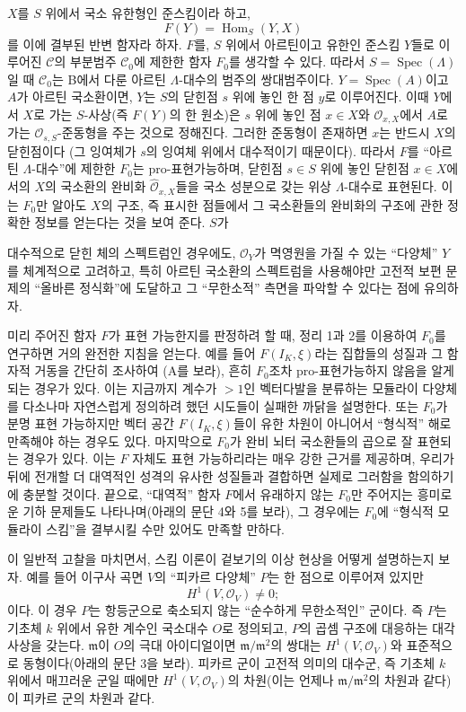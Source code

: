 \documentclass[11pt,twoside,openany]{book}
\numberwithin{equation}{section}
\newcommand{\sourceunit}{front}
\newcommand{\src}[1]{%
  \phantomsection\hypertarget{src:\sourceunit:#1}{}%
  \marginpar{\raggedleft\footnotesize\sffamily #1}%
}
\theoremstyle{plain}
\theoremstyle{definition}
\theoremstyle{remark}
\begin{document}
$X$를 $S$ 위에서 국소 유한형인 준스킴이라 하고,
\[
  F(Y)=\operatorname{Hom}_S(Y,X)
\]
를 이에 결부된 반변 함자라 하자. $F$를, $S$ 위에서 아르틴이고 유한인
준스킴 $Y$들로 이루어진 $\mathcal C$의 부분범주 $\mathcal C_0$에
제한한 함자 $F_0$를 생각할 수 있다. 따라서
$S=\operatorname{Spec}(\Lambda)$일 때 $\mathcal C_0$는 B에서 다룬
아르틴 $\Lambda$-대수의 범주의 쌍대범주이다.
$Y=\operatorname{Spec}(A)$이고 $A$가 아르틴 국소환이면, $Y$는 $S$의
닫힌점 $s$ 위에 놓인 한 점 $y$로 이루어진다. 이때 $Y$에서 $X$로 가는
$S$-사상(즉 $F(Y)$의 한 원소)은 $s$ 위에 놓인 점 $x\in X$와
$\mathcal O_{x,X}$에서 $A$로 가는 $\mathcal O_{s,S}$-준동형을 주는
것으로 정해진다. 그러한 준동형이 존재하면 $x$는 반드시 $X$의 닫힌점이다
(그 잉여체가 $s$의 잉여체 위에서 대수적이기 때문이다). 따라서 $F$를
``아르틴 $\Lambda$-대수''에 제한한 $F_0$는 pro-표현가능하며, 닫힌점
$s\in S$ 위에 놓인 닫힌점 $x\in X$에서의 $X$의 국소환의 완비화
$\widehat{\mathcal O}_{x,X}$들을 국소 성분으로 갖는 위상
$\Lambda$-대수로 표현된다. 이는 $F_0$만 알아도 $X$의 구조, 즉 표시한
점들에서 그 국소환들의 완비화의 구조에 관한 정확한 정보를 얻는다는 것을
보여 준다. $S$가

\src{380}
대수적으로 닫힌 체의 스펙트럼인 경우에도, $\mathcal O_Y$가 멱영원을 가질
수 있는 ``다양체'' $Y$를 체계적으로 고려하고, 특히 아르틴 국소환의
스펙트럼을 사용해야만 고전적 보편 문제의 ``올바른 정식화''에 도달하고
그 ``무한소적'' 측면을 파악할 수 있다는 점에 유의하자.

미리 주어진 함자 $F$가 표현 가능한지를 판정하려 할 때, 정리 1과 2를
이용하여 $F_0$를 연구하면 거의 완전한 지침을 얻는다. 예를 들어
$F(I_K,\xi)$라는 집합들의 성질과 그 함자적 거동을 간단히 조사하여
(A를 보라), 흔히 $F_0$조차 pro-표현가능하지 않음을 알게 되는 경우가
있다. 이는 지금까지 계수가 $>1$인 벡터다발을 분류하는 모듈라이 다양체를
다소나마 자연스럽게 정의하려 했던 시도들이 실패한 까닭을 설명한다.
또는 $F_0$가 분명 표현 가능하지만 벡터 공간 $F(I_K,\xi)$들이 유한
차원이 아니어서 ``형식적'' 해로 만족해야 하는 경우도 있다. 마지막으로
$F_0$가 완비 뇌터 국소환들의 곱으로 잘 표현되는 경우가 있다. 이는 $F$
자체도 표현 가능하리라는 매우 강한 근거를 제공하며, 우리가 뒤에 전개할
더 대역적인 성격의 유사한 성질들과 결합하면 실제로 그러함을 함의하기에
충분할 것이다. 끝으로, ``대역적'' 함자 $F$에서 유래하지 않는 $F_0$만
주어지는 흥미로운 기하 문제들도 나타나며(아래의 문단 4와 5를 보라),
그 경우에는 $F_0$에 ``형식적 모듈라이 스킴''을 결부시킬 수만 있어도
만족할 만하다.

이 일반적 고찰을 마치면서, 스킴 이론이 겉보기의 이상 현상을 어떻게
설명하는지 보자. 예를 들어 이구사 곡면 $V$의 ``피카르 다양체'' $P$는
한 점으로 이루어져 있지만
\[
  H^1(V,\mathcal O_V)\ne 0 ;
\]
이다. 이 경우 $P$는 항등군으로 축소되지 않는 ``순수하게 무한소적인''
군이다. 즉 $P$는 기초체 $k$ 위에서 유한 계수인 국소대수 $O$로 정의되고,
$P$의 곱셈 구조에 대응하는 대각사상을 갖는다. $\mathfrak m$이 $O$의
극대 아이디얼이면 $\mathfrak m/\mathfrak m^2$의 쌍대는
$H^1(V,\mathcal O_V)$와 표준적으로 동형이다(아래의 문단 3을 보라).
피카르 군이 고전적 의미의 대수군, 즉 기초체 $k$ 위에서 매끄러운 군일
때에만 $H^1(V,\mathcal O_V)$의 차원(이는 언제나
$\mathfrak m/\mathfrak m^2$의 차원과 같다)이 피카르 군의 차원과 같다.
\end{document}

